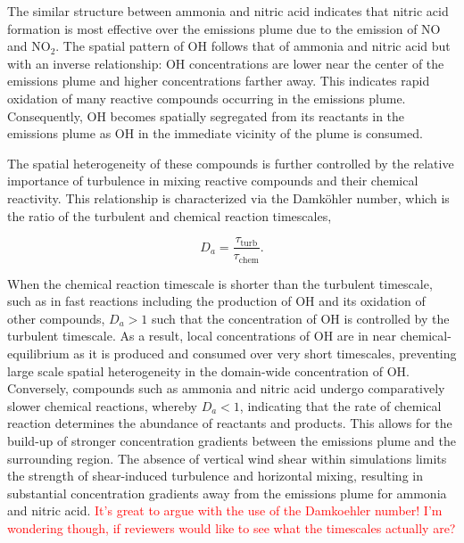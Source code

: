 \documentclass[journal abbreviation, manuscript]{copernicus}
\begin{document}
The similar structure between ammonia and nitric acid
indicates that nitric acid formation is most effective over the
emissions plume due to the emission of NO and NO$_2$. The spatial
pattern of OH follows that of ammonia and nitric acid but with an
inverse relationship: OH concentrations are lower near the center of
the emissions plume and higher concentrations farther away. This
indicates rapid oxidation of many reactive compounds occurring in the
emissions plume. Consequently, OH becomes spatially segregated from
its reactants in the emissions plume as OH in the immediate vicinity
of the plume is consumed.

The spatial heterogeneity of these compounds is further controlled by
the relative importance of turbulence in mixing reactive compounds and
their chemical reactivity. This relationship is characterized via the
Damköhler number, which is the ratio of the turbulent and chemical
reaction timescales,

\begin{equation}
D_a = \frac{\tau_{\mathrm{turb}}}{\tau_{\mathrm{chem}}}.
\end{equation}

When the chemical reaction timescale is shorter than the turbulent
timescale, such as in fast reactions including the production of OH
and its oxidation of other compounds, $D_a > 1$ such that the
concentration of OH is controlled by the turbulent timescale. As a
result, local concentrations of OH are in near chemical-equilibrium as
it is produced and consumed over very short timescales, preventing
large scale spatial heterogeneity in the domain-wide concentration of
OH. Conversely, compounds such as ammonia and nitric acid undergo
comparatively slower chemical reactions, whereby $D_a < 1$, indicating
that the rate of chemical reaction determines the abundance of
reactants and products. This allows for the build-up of stronger
concentration gradients between the emissions plume and the
surrounding region. The absence of vertical wind shear within
simulations limits the strength of shear-induced turbulence and
horizontal mixing, resulting in substantial concentration gradients
away from the emissions plume for ammonia and nitric acid.
\textcolor{red}{It's great to argue with the use of the Damkoehler
  number! I'm wondering though, if reviewers would like to see what
  the timescales actually are?}
\end{document}

